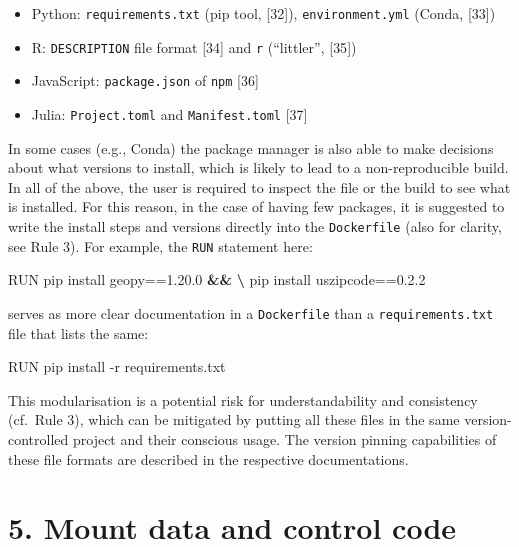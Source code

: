 \documentclass[10pt,letterpaper]{article}
\newenvironment{Shaded}{\begin{snugshade}}{\end{snugshade}}
\newcommand{\ExtensionTok}[1]{#1}
\newcommand{\KeywordTok}[1]{\textcolor[rgb]{0.13,0.29,0.53}{\textbf{#1}}}
\newcommand{\NormalTok}[1]{#1}
\providecommand{\tightlist}{%
  \setlength{\itemsep}{0pt}\setlength{\parskip}{0pt}}
\begin{document}
\begin{itemize}
\tightlist
\item
  Python: \texttt{requirements.txt} (pip tool, {[}32{]}),
  \texttt{environment.yml} (Conda, {[}33{]})
\item
  R: \texttt{DESCRIPTION} file format {[}34{]} and \texttt{r}
  (``littler'', {[}35{]})
\item
  JavaScript: \texttt{package.json} of \texttt{npm} {[}36{]}
\item
  Julia: \texttt{Project.toml} and \texttt{Manifest.toml} {[}37{]}
\end{itemize}

In some cases (e.g., Conda) the package manager is also able to make
decisions about what versions to install, which is likely to lead to a
non-reproducible build. In all of the above, the user is required to
inspect the file or the build to see what is installed. For this reason,
in the case of having few packages, it is suggested to write the install
steps and versions directly into the \texttt{Dockerfile} (also for
clarity, see Rule 3). For example, the \texttt{RUN} statement here:

\begin{Shaded}
\begin{Highlighting}[]
\ExtensionTok{RUN}\NormalTok{ pip install geopy==1.20.0 }\KeywordTok{&&} \KeywordTok{\textbackslash{}}
    \ExtensionTok{pip}\NormalTok{ install uszipcode==0.2.2}
\end{Highlighting}
\end{Shaded}

serves as more clear documentation in a \texttt{Dockerfile} than a
\texttt{requirements.txt} file that lists the same:

\begin{Shaded}
\begin{Highlighting}[]
\ExtensionTok{RUN}\NormalTok{ pip install -r requirements.txt}
\end{Highlighting}
\end{Shaded}

This modularisation is a potential risk for understandability and
consistency (cf.~Rule 3), which can be mitigated by putting all these
files in the same version-controlled project and their conscious usage.
The version pinning capabilities of these file formats are described in
the respective documentations.

\hypertarget{mount-data-and-control-code}{%
\section*{5. Mount data and control
code}\label{mount-data-and-control-code}}
\end{document}
